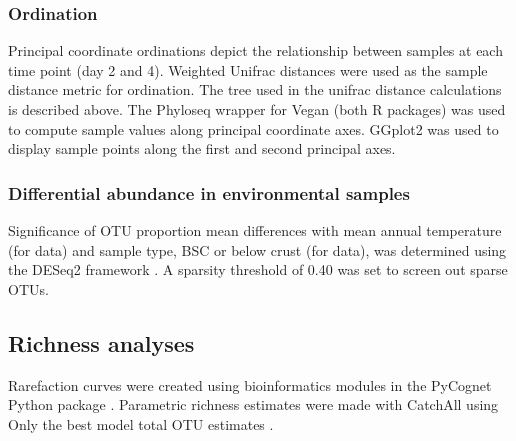 \subsubsection{Ordination}
Principal coordinate ordinations depict the relationship between samples at each time point (day 2 and 4). Weighted Unifrac distances \cite{16332807} were used as the sample distance metric for ordination. The tree used in the unifrac distance calculations is described above. The Phyloseq \cite{24699258} wrapper for Vegan \cite{vegan} (both R packages) was used to compute sample values along principal coordinate axes. GGplot2 \cite{ggplot2} was used to display sample points along the first and second principal axes.  

\subsubsection{Differential abundance in environmental samples}
Significance of OTU proportion mean differences with mean annual temperature (for \citet{Garcia_Pichel_2013} data) and sample type, BSC or below crust (for \citet{Steven_2013} data), was determined using the DESeq2 framework \cite{24699258, Love_2014}. A sparsity threshold of 0.40 was set to screen out sparse OTUs.  

\subsection{Richness analyses}
Rarefaction curves were created using bioinformatics modules in the PyCognet Python package \cite{Knight_2007}. Parametric richness estimates were made with CatchAll using Only the best model total OTU estimates \cite{BUNGE_2010}.













